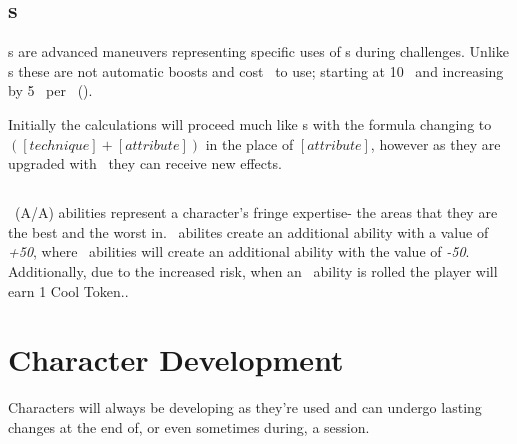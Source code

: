 \section{\techn s\index{\techn}}\label{sec:techniques}
\techn s are advanced maneuvers representing specific uses of \attribute s during challenges. Unlike \skill s these are not automatic boosts and cost \ENful\ to use; starting at 10 \EN\ and increasing by 5 \EN\ per \advancement\ (\advanmini). 

Initially the calculations will proceed much like \skill s with the formula changing to $([technique]+[attribute])$ in the place of $[attribute]$, however as they are upgraded with \advanmini\ they can receive new effects.


\section{\AWEAWF{}}\label{sec:aweawf}
\AWEAWF\ (A/A) abilities represent a character's fringe expertise- the areas that they are the best and the worst in. \AWE\ abilites create an additional ability with a value of \emph{+50}, where \AWF\ abilities will create an additional ability with the value of \emph{-50}. Additionally, due to the increased risk, when an \AWF\ ability is rolled the player will earn 1 Cool Token.. 



\chapter{Character Development}\label{ch:char_develop}
Characters will always be developing as they're used and can undergo lasting changes at the end of, or even sometimes during, a session.

